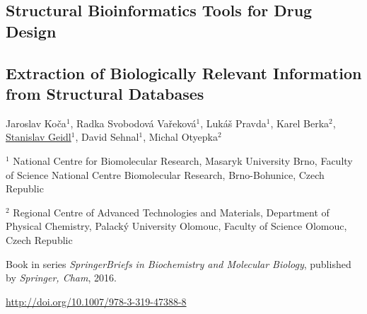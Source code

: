 \begin{center}
\section{\centering Structural Bioinformatics Tools for Drug Design}

\subsection*{\centering Extraction of Biologically Relevant Information from Structural Databases}

Jaroslav Koča$^1$, Radka Svobodová Vařeková$^1$, Lukáš Pravda$^1$,
Karel Berka$^2$, \underline{Stanislav Geidl$^1$}, David Sehnal$^1$,
Michal Otyepka$^2$

\vspace{1cm}

$^1$ National Centre for Biomolecular Research, Masaryk University Brno,
Faculty of Science National Centre Biomolecular Research, Brno-Bohunice,
Czech Republic

$^2$ Regional Centre of Advanced Technologies and Materials,
Department of Physical Chemistry, Palacký University Olomouc,
Faculty of Science Olomouc, Czech Republic

\vspace{1cm}

Book in series \textit{SpringerBriefs in Biochemistry and Molecular Biology},
published by \textit{Springer, Cham}, 2016.

\vspace{1cm}

\url{http://doi.org/10.1007/978-3-319-47388-8}

\end{center}



